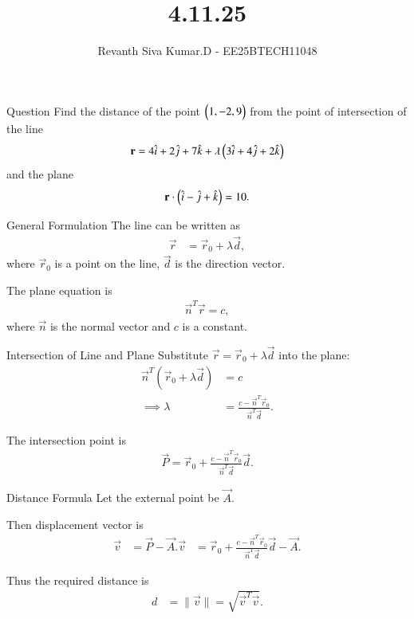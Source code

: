 \documentclass{beamer}
\title %
{4.11.25}
\author %
{Revanth Siva Kumar.D - EE25BTECH11048}
\begin{document}
	
	\frame{\titlepage}
	
	\begin{frame}{Question}
		Find the distance of the point $\begin{pmatrix}1,-2,9\end{pmatrix}$ from the point of intersection of the line
		\[
		\mathbf{r} = 4\hat{i} + 2\hat{j} + 7\hat{k} + \lambda \begin{pmatrix}3\hat{i} + 4\hat{j} + 2\hat{k}\end{pmatrix}
		\]
		and the plane
		\[
		\mathbf{r}\cdot\begin{pmatrix}\hat{i} - \hat{j} + \hat{k}\end{pmatrix} = 10.
		\]
	\end{frame}
	
	
	\begin{frame}{General Formulation}
	The line can be written as
	\begin{align}
	    \vec{r} &= \vec{r}_0 + \lambda \vec{d},
	\end{align}
	where $\vec{r}_0$ is a point on the line, $\vec{d}$ is the direction vector.
	
	The plane equation is
	\begin{align}
	    \vec{n}^T \vec{r} = c,
	\end{align}
	where $\vec{n}$ is the normal vector and $c$ is a constant.
	\end{frame}
	
	
	\begin{frame}{Intersection of Line and Plane}
	Substitute $\vec{r} = \vec{r}_0 + \lambda \vec{d}$ into the plane:
	\begin{align}
	    \vec{n}^T(\vec{r}_0 + \lambda \vec{d}) &= c \\
	    \implies \lambda &= \frac{c - \vec{n}^T \vec{r}_0}{\vec{n}^T \vec{d}}.
	\end{align}
	
	The intersection point is
	\begin{align}
	    \vec{P} = \vec{r}_0 + \frac{c - \vec{n}^T \vec{r}_0}{\vec{n}^T \vec{d}} \vec{d}.
	\end{align}
	\end{frame}
	
	
	\begin{frame}{Distance Formula}
	Let the external point be $\vec{A}$.
	
	Then displacement vector is
	\begin{align}
	    \vec{v} &= \vec{P} - \vec{A}.
	    \vec{v} &= \vec{r}_0 + \frac{c - \vec{n}^T \vec{r}_0}{\vec{n}^T \vec{d}} \vec{d} -\vec{A}.
	\end{align}
	
	Thus the required distance is
	\begin{align}
	    d &= \|\vec{v}\| = \sqrt{\vec{v}^T \vec{v}}.
	\end{align}
	\end{frame}
	
\end{document}
